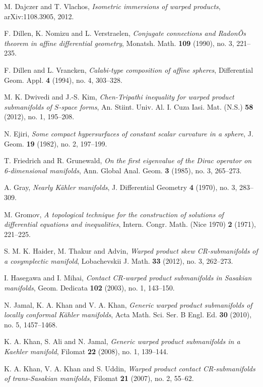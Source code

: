 \documentclass{amsart}
\theoremstyle{plain}
\numberwithin{equation}{section}
\theoremstyle{remark}
\numberwithin{equation}{section}
\begin{document}
\begin{thebibliography}{120}
 M. Dajczer and T. Vlachos, {\it Isometric immersions of warped products}, arXiv:1108.3905, 2012.

 F. Dillen, K. Nomizu and L. Verstraelen,  {\it Conjugate connections and RadonÕs theorem in affine differential geometry},   Monatsh. Math.  {\bf  109} (1990), no. 3,  221--235.

 F. Dillen and  L. Vrancken, {\it Calabi-type composition of affine spheres}, {Differential Geom. Appl.} {\bf 4} (1994),  no. 4, 303--328.

 M. K. Dwivedi and J.-S. Kim, {\it Chen-Tripathi inequality for warped product submanifolds of $S$-space forms}, An. Stiint. Univ. Al. I. Cuza Iasi. Mat. (N.S.) {\bf 58} (2012),  no. 1, 195--208. 

 N. Ejiri,  {\it Some compact hypersurfaces of constant scalar curvature  in a sphere}, J. Geom. {\bf 19} (1982), no. 2, 197--199. 

 T. Friedrich and R. Grunewald, {\it On the first eigenvalue of the Dirac operator on 6-dimensional manifolds}, Ann. Global Anal. Geom. {\bf 3} (1985), no. 3, 265--273.

 A. Gray, {\it  Nearly K\"ahler manifolds},  J. Differential Geometry {\bf 4} (1970), no. 3,  283--309.

 M. Gromov, {\em A topological technique for the construction of solutions of differential equations and inequalities}, Intern. Congr. Math. (Nice 1970) {\bf  2} (1971), 221--225.

 S. M. K. Haider, M. Thakur  and Advin, {\it Warped product skew CR-submanifolds of a cosymplectic manifold}, Lobachevskii J. Math. {\bf 33} (2012), no. 3, 262--273.

 I. Hasegawa and I. Mihai, {\it Contact CR-warped product submanifolds in Sasakian manifolds}, Geom. Dedicata {\bf 102} (2003), no. 1, 143--150.

 N. Jamal, K. A. Khan and V. A. Khan, {\it Generic warped product submanifolds of locally conformal K\"ahler manifolds}, Acta Math. Sci. Ser. B Engl. Ed. {\bf 30} (2010), no. 5, 1457--1468.

 K. A. Khan, S. Ali and N. Jamal, {\it Generic warped product submanifolds in a Kaehler manifold}, Filomat {\bf 22} (2008), no. 1, 139--144.

 K. A. Khan, V. A. Khan and S. Uddin, {\it Warped product contact CR-submanifolds of trans-Sasakian manifolds},  Filomat {\bf 21} (2007), no. 2, 55--62.


\end{thebibliography}
\end{document}
